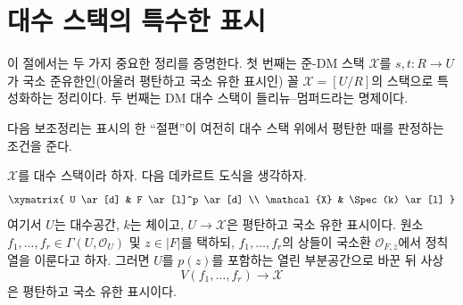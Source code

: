 \section{대수 스택의 특수한 표시}
\label{section-presentations}

\noindent
이 절에서는 두 가지 중요한 정리를 증명한다. 첫 번째는 준-DM 스택
$\mathcal{X}$를 $s, t : R \to U$가 국소 준유한인(아울러 평탄하고
국소 유한 표시인) 꼴 $\mathcal{X} = [U/R]$의 스택으로 특성화하는
정리이다. 두 번째는 DM 대수 스택이 들리뉴–멈퍼드라는 명제이다.

\medskip\noindent
다음 보조정리는 표시의 한 ``절편''이 여전히 대수 스택 위에서
평탄한 때를 판정하는 조건을 준다.

\begin{lemma}
\label{lemma-slice}
$\mathcal{X}$를 대수 스택이라 하자. 다음 데카르트 도식을 생각하자.
$$
\xymatrix{
U \ar[d] & F \ar[l]^p \ar[d] \\
\mathcal{X} & \Spec(k) \ar[l]
}
$$
여기서 $U$는 대수공간, $k$는 체이고, $U \to \mathcal{X}$은 평탄하고
국소 유한 표시이다. 원소
$f_1, \ldots, f_r \in \Gamma(U, \mathcal{O}_U)$
및 $z \in |F|$를 택하되, $f_1, \ldots, f_r$의 상들이 국소환
$\mathcal{O}_{F, \overline{z}}$에서 정칙열을 이룬다고 하자.
그러면 $U$를 $p(z)$를 포함하는 열린 부분공간으로 바꾼 뒤 사상
$$
V(f_1, \ldots, f_r) \longrightarrow \mathcal{X}
$$
은 평탄하고 국소 유한 표시이다.
\end{lemma}

